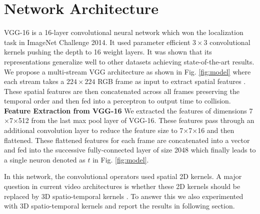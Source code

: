 \section{Network Architecture}
VGG-16 \cite{vgg} is a 16-layer convolutional neural network which won the localization task in ImageNet Challenge 2014. It used parameter efficient $3 \times 3$ convolutional kernels pushing the depth to 16 weight layers. It was shown that its representations generalize well to other datasets achieving state-of-the-art results. We propose a multi-stream VGG architecture as shown in Fig. \ref{fig:model} where each stream takes a $224 \times 224$ RGB frame as input to extract spatial features . These spatial features are then concatenated across all frames preserving the temporal order and then fed into a perceptron to output time to collision. \\


\textbf{Feature Extraction from VGG-16} We extracted the features of dimensions  7$\times$7$\times$512 from the last max pool layer of VGG-16. These features pass through an additional convolution layer to reduce the feature size to 7$\times$7$\times$16 and then flattened. These flattened features for each frame are concatenated into a vector and fed into the successive fully-connected layer of size 2048 which finally leads to a single neuron denoted as $t$ in Fig. \ref{fig:model}.  

In this network, the convolutional operators used spatial 2D kernels. A major question in current video architectures is whether these 2D kernels should be replaced by 3D spatio-temporal kernels \cite{i3d}. To answer this we also experimented with 3D spatio-temporal kernels and report the results in following section. \\

